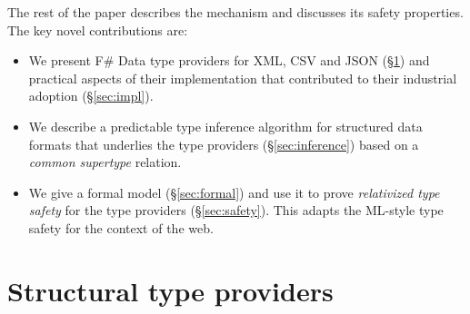 \documentclass[10pt,preprint,clearpagebib]{sigplanconf}
\begin{document}
The rest of the paper describes the mechanism and discusses its safety properties. 
The key novel contributions are:

\begin{itemize}
\item We present F\# Data type providers for XML, CSV and JSON (\S\ref{sec:providers}) 
  and practical aspects of their implementation that contributed to their industrial 
  adoption (\S\ref{sec:impl}). 

\item We describe a predictable type inference algorithm for structured data formats that
  underlies the type providers (\S\ref{sec:inference}) based on a \emph{common supertype}
  relation.

\item We give a formal model (\S\ref{sec:formal}) and use it to prove
  \emph{relativized type safety} for the type providers (\S\ref{sec:safety}).
  This adapts the ML-style type safety for the context of the web.
\end{itemize}





%
%

\section{Structural type providers}
\label{sec:providers}
\end{document}
